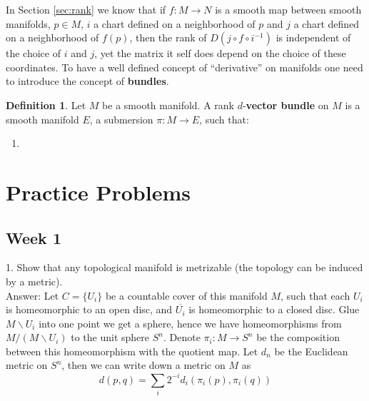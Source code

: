 \documentclass{article}
\theoremstyle{definition}
\newtheorem{dfn}[thm]{Definition}
\newtheorem{rmk}[thm]{Remark}
\begin{document}
In Section \ref{sec:rank} we know that if $f: M\rightarrow N$ is a smooth map between smooth manifolds, $p\in M$, $i$ a chart defined on a neighborhood of $p$ and $j$ a chart defined on a neighborhood of $f(p)$, then the rank of $D(j\circ f\circ i^{-1})$ is independent of the choice of $i$ and $j$, yet the matrix it self does depend on the choice of these coordinates. To have a well defined concept of ``derivative'' on manifolds one need to introduce the concept of {\bf bundles}.

\begin{dfn}
    Let $M$ be a smooth manifold. A rank $d$-{\bf vector bundle} on $M$ is a smooth manifold $E$, a submersion $\pi: M\rightarrow E$, such that:
\begin{enumerate}
    \item 
\end{enumerate}

  
\end{dfn}




\newpage

\appendix

\section{Practice Problems}

\subsection{Week 1}

1. Show that any topological manifold is metrizable (the topology can be induced by a metric).\\

Answer: Let $C=\{U_i\}$ be a countable cover of this manifold $M$, such that each $U_i$ is homeomorphic to an open disc, and $\overline{U_i}$ is homeomorphic to a closed disc. Glue $M\backslash U_i$ into one point we get a sphere, hence we have homeomorphisms from $M/(M\backslash U_i)$ to the unit sphere $S^n$. Denote $\pi_i: M\rightarrow S^n$ be the composition between this homeomorphism with the quotient map. Let $d_n$ be the Euclidean metric on $S^n$, then we can write down a metric on $M$ as 
\[d(p, q)=\sum_i 2^{-i}d_i(\pi_i(p), \pi_i(q))\]
\end{document}
